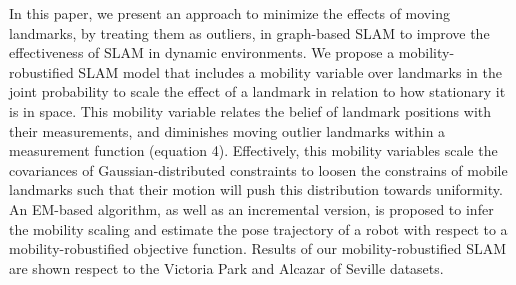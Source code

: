 In this paper, we present an approach to minimize the effects of
moving landmarks, by treating them as outliers, in graph-based SLAM to
improve the effectiveness of SLAM in dynamic environments.  We
propose a mobility-robustified SLAM model that includes a mobility
variable over landmarks in the joint probability to scale the effect
of a landmark in relation to how stationary it is in space.  This
mobility variable relates the belief of landmark positions with their
measurements, and diminishes moving outlier landmarks within a
measurement function (equation 4).
Effectively, this mobility variables scale the covariances
of Gaussian-distributed constraints to loosen the constrains of mobile landmarks such that their motion will push this distribution towards uniformity.
  An EM-based algorithm, as well as
an incremental version, is proposed to infer the mobility scaling
and estimate the pose trajectory of a robot with respect to a
mobility-robustified objective function. Results of our
mobility-robustified SLAM are shown respect to the
Victoria Park \cite{isam} and Alcazar of Seville \cite{iros14-frog} datasets.
